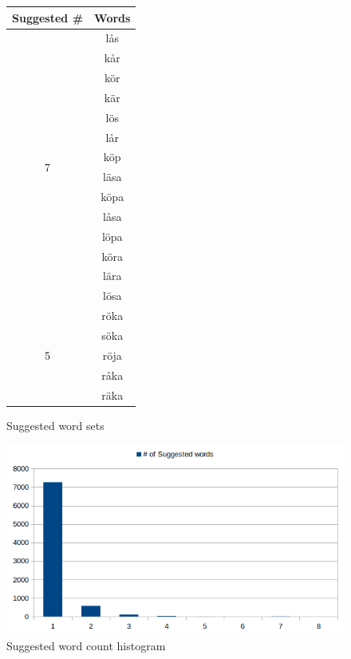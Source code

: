 \documentclass[a4paper,11pt]{article}
\begin{document}
    \begin{figure}[H]
        \centering
        
        \begin{tabular}{c|c}
            \textbf{Suggested \#} & \textbf{Words} \\
            \hline
            \hline
            \multirow{14}{*}{7} & lås \\
            & kår \\
            & kör \\
            & kär \\
            & lös \\
            & lår \\
            & köp \\
            \cline{2-2}
            & läsa \\
            & köpa \\
            & låsa \\
            & löpa \\
            & köra \\
            & lära \\
            & lösa \\
            \hline
            \multirow{5}{*}{5} & röka \\
            & söka \\
            & röja \\
            & råka \\
            & räka \\
        \end{tabular}
        \caption{Suggested word sets}
        \label{fig:lookup-table}
    \end{figure}

    \begin{figure}[H]
        \centering
        \includegraphics[width=\textwidth]{duplicates.png}
        \caption{Suggested word count histogram}
        \label{fig:duplicates}
    \end{figure}
\end{document}
